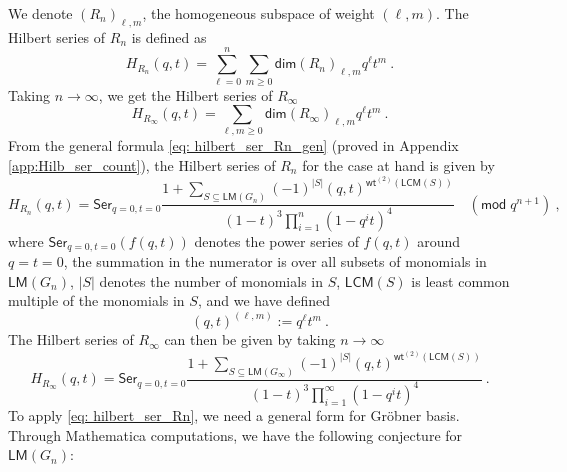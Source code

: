 \documentclass[a4paper,10pt]{article}
\newcommand{\mr}[1]{\mathsf{#1}}
\newcommand{\myRed}[1]{\textcolor{red}{#1}}
\begin{document}
We denote $(R_n)_{\ell,m}$, the homogeneous subspace of weight $(\ell,m)$.
The Hilbert series of $R_n$ is defined as
\begin{equation}
H_{R_n}(q, t)=\sum_{\ell=0}^n \sum_{m \geq 0} \mr{dim}\left(R_n\right)_{\ell, m} q^{\ell} t^m~.
\end{equation}
Taking $n \rightarrow \infty$, we get the Hilbert series of  $R_{\infty}$
\begin{equation}
H_{R_{\infty}}(q, t)=\sum_{\ell, m \geq 0} \mr{dim}\left(R_{\infty}\right)_{\ell, m} q^{\ell} t^m~.
\end{equation}
From the general formula \eqref{eq: hilbert_ser_Rn_gen} (proved in Appendix \ref{app:Hilb_ser_count}), the Hilbert series of $R_n$ for the case at hand is given by
\begin{equation}
\label{eq: hilbert_ser_Rn}
H_{R_n}(q,t) = \mr{Ser}_{q=0,t=0}\frac{1+\sum_{S\subseteq \mr{LM}(G_n)}(-1)^{|S|}(q,t)^{\mr{wt}^{(2)}(\mr{LCM}(S))}}{(1-t)^3 \prod_{i=1}^{n}\left(1-q^i t\right)^4} \quad (\mr{mod} \;q^{n+1})~,
\end{equation}
where $\mr{Ser}_{q=0,t=0}(f(q,t))$ denotes the power series of $f(q,t)$ around $q=t=0$, the summation in the numerator is over all subsets of monomials in $\mr{LM}(G_n)$, $|S|$ denotes the number of monomials in $S$, $\mr{LCM}(S)$ is least common multiple of the monomials in $S$, and we have defined
\begin{equation}
(q,t)^{(\ell,m)} := q^{\ell} t^m ~.   
\end{equation}
The Hilbert series of $R_\infty$ can then be given by taking $n\to \infty$
\begin{equation}
\label{eq: hilbert_ser_Rinf}
H_{R_\infty}(q,t) = \mr{Ser}_{q=0,t=0}\frac{1+\sum_{S\subseteq \mr{LM}(G_\infty)}(-1)^{|S|}(q,t)^{\mr{wt}^{(2)}(\mr{LCM}(S))}}{(1-t)^3 \prod_{i=1}^{\infty}\left(1-q^i t\right)^4}~.
\end{equation}
To apply \eqref{eq: hilbert_ser_Rn}, we need a general form for Gr\"{o}bner basis.
Through Mathematica computations, we have the following conjecture for $\mr{LM}(G_n)$:
\end{document}
